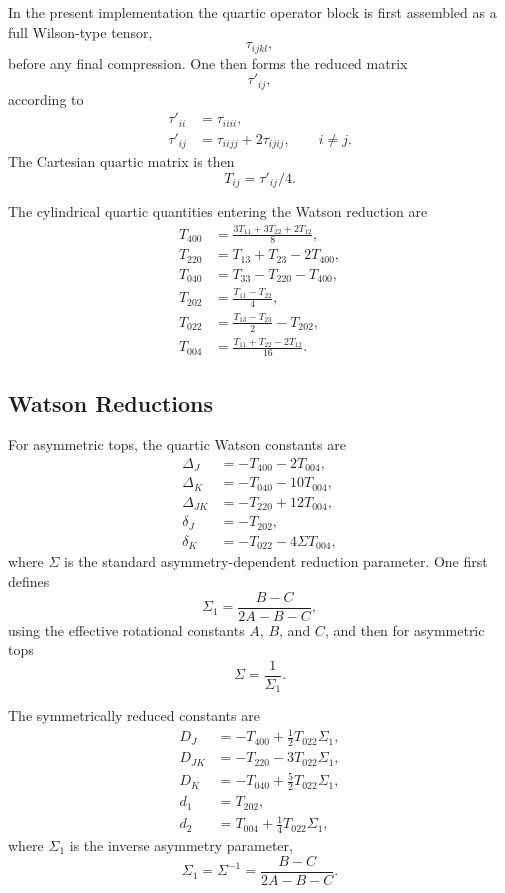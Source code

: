 \documentclass[11pt,a4paper]{article}
\begin{document}
In the present implementation the quartic operator block is first assembled as a full Wilson-type tensor,
\[
\tau_{ijkl},
\]
before any final compression. One then forms the reduced matrix
\[
\tau'_{ij},
\]
according to
\begin{align}
\tau'_{ii} &= \tau_{iiii},\\
\tau'_{ij} &= \tau_{iijj} + 2\tau_{ijij},
\qquad i\neq j.
\end{align}
The Cartesian quartic matrix is then
\[
T_{ij} = \tau'_{ij}/4.
\]

The cylindrical quartic quantities entering the Watson reduction are
\begin{align}
T_{400} &= \frac{3T_{11}+3T_{22}+2T_{12}}{8},\\
T_{220} &= T_{13}+T_{23}-2T_{400},\\
T_{040} &= T_{33}-T_{220}-T_{400},\\
T_{202} &= \frac{T_{11}-T_{22}}{4},\\
T_{022} &= \frac{T_{13}-T_{23}}{2}-T_{202},\\
T_{004} &= \frac{T_{11}+T_{22}-2T_{12}}{16}.
\end{align}

\subsection{Watson Reductions}
For asymmetric tops, the quartic Watson constants are
\begin{align}
\Delta_J   &= -T_{400}-2T_{004},\\
\Delta_K   &= -T_{040}-10T_{004},\\
\Delta_{JK}&= -T_{220}+12T_{004},\\
\delta_J   &= -T_{202},\\
\delta_K   &= -T_{022}-4\Sigma T_{004},
\end{align}
where \(\Sigma\) is the standard asymmetry-dependent reduction parameter. One first defines
\begin{equation}
\Sigma_1 = \frac{B-C}{2A-B-C},
\end{equation}
using the effective rotational constants \(A\), \(B\), and \(C\), and then for asymmetric tops
\begin{equation}
\Sigma = \frac{1}{\Sigma_1}.
\end{equation}

The symmetrically reduced constants are
\begin{align}
D_J   &= -T_{400}+\frac{1}{2}T_{022}\Sigma_1,\\
D_{JK}&= -T_{220}-3T_{022}\Sigma_1,\\
D_K   &= -T_{040}+\frac{5}{2}T_{022}\Sigma_1,\\
d_1   &= T_{202},\\
d_2   &= T_{004}+\frac{1}{4}T_{022}\Sigma_1,
\end{align}
where \(\Sigma_1\) is the inverse asymmetry parameter,
\[
\Sigma_1=\Sigma^{-1}=\frac{B-C}{2A-B-C}.
\]
\end{document}
